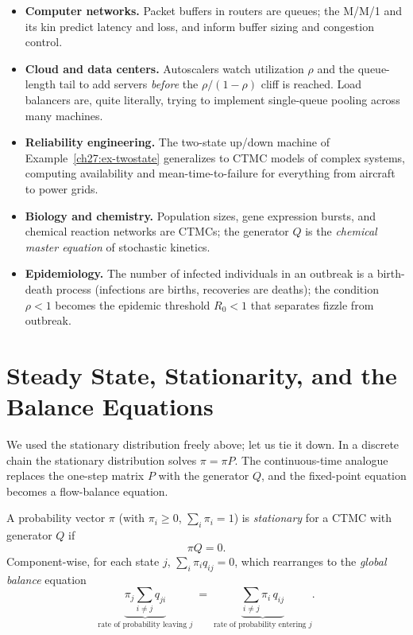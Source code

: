 \begin{applicationbox}
\begin{itemize}
  \item \textbf{Computer networks.} Packet buffers in routers are queues; the M/M/1 and its kin
  predict latency and loss, and inform buffer sizing and congestion control.
  \item \textbf{Cloud and data centers.} Autoscalers watch utilization $\rho$ and the queue-length
  tail to add servers \emph{before} the $\rho/(1-\rho)$ cliff is reached. Load balancers are, quite
  literally, trying to implement single-queue pooling across many machines.
  \item \textbf{Reliability engineering.} The two-state up/down machine of
  Example~\ref{ch27:ex-twostate} generalizes to CTMC models of complex systems, computing
  availability and mean-time-to-failure for everything from aircraft to power grids.
  \item \textbf{Biology and chemistry.} Population sizes, gene expression bursts, and chemical
  reaction networks are CTMCs; the generator $Q$ is the \emph{chemical master equation} of
  stochastic kinetics.
  \item \textbf{Epidemiology.} The number of infected individuals in an outbreak is a birth-death
  process (infections are births, recoveries are deaths); the condition $\rho < 1$ becomes the
  epidemic threshold $R_0 < 1$ that separates fizzle from outbreak.
\end{itemize}
\end{applicationbox}

\section{Steady State, Stationarity, and the Balance Equations}
\label{ch27:steady}

We used the stationary distribution freely above; let us tie it down. In a discrete chain the
stationary distribution solves $\pi = \pi P$. The continuous-time analogue replaces the
one-step matrix $P$ with the generator $Q$, and the fixed-point equation becomes a flow-balance
equation.

\begin{definition}
\label{ch27:def-stationary}
A probability vector $\pi$ (with $\pi_i \ge 0$, $\sum_i \pi_i = 1$) is \emph{stationary} for a CTMC
with generator $Q$ if
\[
  \boxed{\,\pi Q = 0.\,}
\]
Component-wise, for each state $j$, $\sum_{i} \pi_i q_{ij} = 0$, which rearranges to the
\emph{global balance} equation
\[
  \underbrace{\pi_j \sum_{i \ne j} q_{ji}}_{\text{rate of probability leaving } j}
  \;=\;
  \underbrace{\sum_{i \ne j} \pi_i\, q_{ij}}_{\text{rate of probability entering } j}.
\]
\end{definition}

